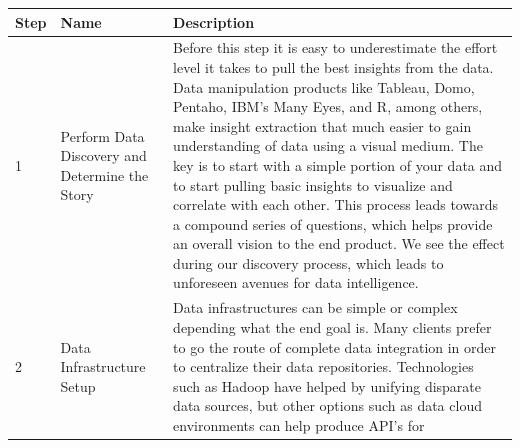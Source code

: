 \documentclass[]{book}
\begin{document}
\begin{longtable}[]{@{}lll@{}}
\toprule
\begin{minipage}[b]{0.04\columnwidth}\raggedright\strut
\textbf{Step}\strut
\end{minipage} & \begin{minipage}[b]{0.11\columnwidth}\raggedright\strut
\textbf{Name}\strut
\end{minipage} & \begin{minipage}[b]{0.76\columnwidth}\raggedright\strut
\textbf{Description}\strut
\end{minipage}\tabularnewline
\midrule
\endhead
\begin{minipage}[t]{0.04\columnwidth}\raggedright\strut
1\strut
\end{minipage} & \begin{minipage}[t]{0.11\columnwidth}\raggedright\strut
Perform Data Discovery and Determine the Story\strut
\end{minipage} & \begin{minipage}[t]{0.76\columnwidth}\raggedright\strut
Before this step it is easy to underestimate the effort level it takes
to pull the best insights from the data. Data manipulation products like
Tableau, Domo, Pentaho, IBM's Many Eyes, and R, among others, make
insight extraction that much easier to gain understanding of data using
a visual medium. The key is to start with a simple portion of your data
and to start pulling basic insights to visualize and correlate with each
other. This process leads towards a compound series of questions, which
helps provide an overall vision to the end product. We see the effect
during our discovery process, which leads to unforeseen avenues for data
intelligence.\strut
\end{minipage}\tabularnewline
\begin{minipage}[t]{0.04\columnwidth}\raggedright\strut
2\strut
\end{minipage} & \begin{minipage}[t]{0.11\columnwidth}\raggedright\strut
Data Infrastructure Setup\strut
\end{minipage} & \begin{minipage}[t]{0.76\columnwidth}\raggedright\strut
Data infrastructures can be simple or complex depending what the end
goal is. Many clients prefer to go the route of complete data
integration in order to centralize their data repositories. Technologies
such as Hadoop have helped by unifying disparate data sources, but other
options such as data cloud environments can help produce API's for

\end{minipage}
\end{longtable}
\end{document}
